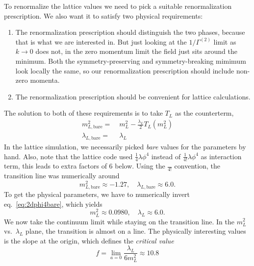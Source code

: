 \documentclass[12pt]{article}
\begin{document}
To renormalize the lattice values we need to pick a suitable
renormalization prescription. We also want it to satisfy two physical
requirements:
\begin{enumerate}
\item The renormalization prescription should distinguish the two
  phases, because that is what we are interested in. But just looking
  at the $1/\Gamma^{(2)}$ limit as $k\to 0$ does not, in the zero
  momentum limit the field just sits around the minimum. Both the
  symmetry-preserving and symmetry-breaking mimimum look locally the
  same, so our renormalization prescription should include non-zero
  momenta.
\item The renormalization prescription should be convenient for
  lattice calculations.
\end{enumerate}
The solution to both of these requirements is to take $T_L$ as the
counterterm,
\begin{equation}
  \label{eq:2dphi4bare}
  \begin{split}
    m^2_{L, \text{bare}} =&\; m_L^2 - \frac{\lambda_L}{2} T_L(m^2_L)
    \\ 
    \lambda_{L, \text{bare}} =&\; \lambda_L
  \end{split}
\end{equation}
In the lattice simulation, we necessarily picked \emph{bare} values
for the parameters by hand. Also, note that the lattice code used
$\frac{1}{4}\lambda \phi^4$ instead of $\frac{1}{4!}\lambda \phi^4$ as
interaction term, this leads to extra factors of $6$ below. Using the
$\frac{}{4!}$ convention, the transition line was numerically around
\begin{equation}
  m^2_{L,\text{bare}} \approx -1.27
  ,\quad
  \lambda_{L, \text{bare}} \approx 6.0.
\end{equation}
To get the physical parameters, we have to numerically invert
eq.~\eqref{eq:2dphi4bare}, which yields
\begin{equation}
  m_L^2 \approx 0.0980
  ,\quad
  \lambda_L \approx 6.0
  .
\end{equation}
We now take the continuum limit while staying on the transition
line. In the $m_L^2$ vs.\ $\lambda_L$ plane, the transition is almost
on a line. The physically interesting values is the slope at the
origin, which defines the \emph{critical value}
\begin{equation}
  f = \lim_{a=0} 
  \frac{\lambda_L}{6 m^2_L}
  \approx
  10.8
\end{equation}
\end{document}
